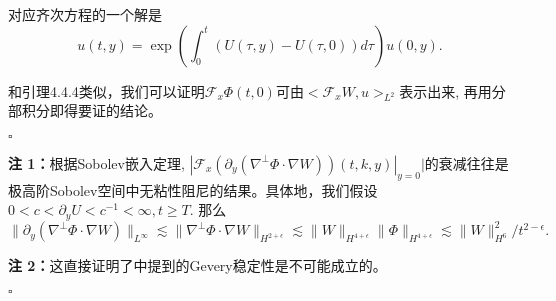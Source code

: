 对应齐次方程的一个解是$$u(t,y)=\exp\left(\int_0^t(U(\tau,y)-U(\tau,0))d\tau\right)u(0,y).$$

和引理4.4.4类似，我们可以证明$\mathcal{F}_x\Phi(t,0)$可由$<\mathcal{F}_x W,u>_{L^2}$表示出来, 再用分部积分即得要证的结论。
\begin{flushright}
$\square$
\end{flushright}

\textbf{注 1：}根据Sobolev嵌入定理, $|\mathcal{F}_x(\partial_y (\nabla^{\perp}\Phi\cdot\nabla W))(t,k,y)|_{y=0}|$的衰减往往是极高阶Sobolev空间中无粘性阻尼的结果。具体地，我们假设$0<c<\partial_yU<c^{-1}<\infty,t\geq T$. 那么
$$\|\partial_y(\nabla^{\perp}\Phi\cdot\nabla W)\|_{L^{\infty}}\lesssim\|\nabla^{\perp}\Phi\cdot\nabla W\|_{H^{2+\epsilon}}\lesssim \|W\|_{H^{4+\epsilon}}\|\Phi\|_{H^{4+\epsilon}}\lesssim \|W\|_{H^6}^2/t^{2-\epsilon}.$$

\textbf{注 2：}这直接证明了\citep{BM15}中提到的Gevery稳定性是不可能成立的。
\begin{flushright}
$\square$
\end{flushright}
